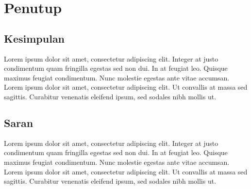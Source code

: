 \chapter{Penutup}

\section{Kesimpulan}

Lorem ipsum dolor sit amet, consectetur adipiscing elit. Integer at justo condimentum quam fringilla egestas sed non dui. In at feugiat leo. Quisque maximus feugiat condimentum. Nunc molestie egestas ante vitae accumsan. Lorem ipsum dolor sit amet, consectetur adipiscing elit. Ut convallis at massa sed sagittis. Curabitur venenatis eleifend ipsum, sed sodales nibh mollis ut.

\section{Saran}

Lorem ipsum dolor sit amet, consectetur adipiscing elit. Integer at justo condimentum quam fringilla egestas sed non dui. In at feugiat leo. Quisque maximus feugiat condimentum. Nunc molestie egestas ante vitae accumsan. Lorem ipsum dolor sit amet, consectetur adipiscing elit. Ut convallis at massa sed sagittis. Curabitur venenatis eleifend ipsum, sed sodales nibh mollis ut.
